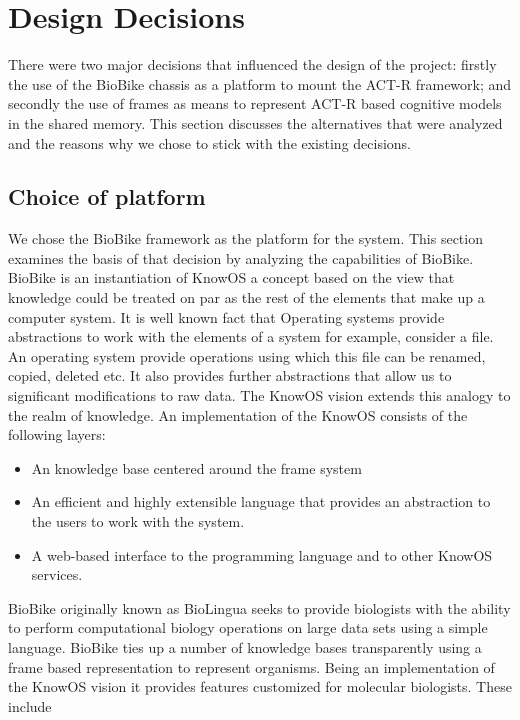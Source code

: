 \section{Design Decisions}
There were two major decisions that influenced the design of the
project: firstly the use of the BioBike chassis as a platform to
mount the ACT-R framework; and secondly the use of frames as means to
represent ACT-R based cognitive models in the shared memory. This
section discusses the alternatives that were analyzed and the reasons
why we chose to stick with the existing decisions.

\subsection{Choice of platform}

We chose the BioBike framework as the platform for the system. This
section examines the basis of that decision by analyzing the
capabilities of BioBike. BioBike is an instantiation of
KnowOS\cite{oai:CiteSeerXPSU:10.1.1.75.7132} a concept based on the
view that knowledge could be treated on par as the rest of the
elements that make up a computer system. It is well known fact that
Operating systems provide abstractions to work with the elements of a
system for example, consider a file. An operating system provide
operations using which this file can be renamed, copied, deleted
etc. It also provides further abstractions that allow us to significant
modifications to raw data. The KnowOS vision extends this analogy to
the realm of knowledge. An implementation of the KnowOS consists of
the following layers\cite{oai:CiteSeerXPSU:10.1.1.75.7132}:


\begin{itemize}
\item An knowledge base centered around the frame system
\item An efficient and highly extensible language that provides an
  abstraction to the users to work with the system.
\item A web-based interface to the programming language and to other
  KnowOS services.
\end{itemize}

BioBike originally known as BioLingua seeks to provide biologists with
the ability to perform computational biology operations on large data
sets using a simple language. BioBike ties up a number of knowledge
bases transparently using a frame based representation to represent
organisms. Being an implementation of the KnowOS vision it provides
features customized for molecular biologists. These
include\cite{journals/bioinformatics/MassarTES05}

